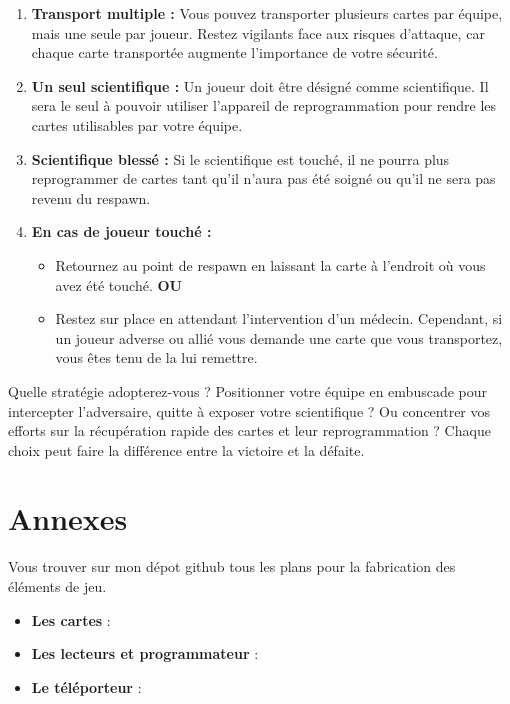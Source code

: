 \documentclass{template}
\begin{document}
\begin{enumerate}
    \item \textbf{Transport multiple :} Vous pouvez transporter plusieurs cartes par équipe, mais une seule par joueur. Restez vigilants face aux risques d’attaque, car chaque carte transportée augmente l’importance de votre sécurité.
    \item \textbf{Un seul scientifique :} Un joueur doit être désigné comme scientifique. Il sera le seul à pouvoir utiliser l’appareil de reprogrammation pour rendre les cartes utilisables par votre équipe.
    \item \textbf{Scientifique blessé :} Si le scientifique est touché, il ne pourra plus reprogrammer de cartes tant qu’il n’aura pas été soigné ou qu’il ne sera pas revenu du respawn.
    \item \textbf{En cas de joueur touché :}
    \begin{itemize}
        \item Retournez au point de respawn en laissant la carte à l’endroit où vous avez été touché.\newline
        \textbf{OU}
        \item Restez sur place en attendant l’intervention d’un médecin. Cependant, si un joueur adverse ou allié vous demande une carte que vous transportez, vous êtes tenu de la lui remettre.
    \end{itemize}
\end{enumerate}

Quelle stratégie adopterez-vous ? Positionner votre équipe en embuscade pour intercepter l’adversaire, quitte à exposer votre scientifique ? Ou concentrer vos efforts sur la récupération rapide des cartes et leur reprogrammation ? Chaque choix peut faire la différence entre la victoire et la défaite.






\section{Annexes}

Vous trouver sur mon dépot github tous les plans pour la fabrication des éléments de jeu.

\begin{itemize}
    \item \textbf{Les cartes} : 
    \item \textbf{Les lecteurs et programmateur} : 
    \item \textbf{Le téléporteur} : 
\end{itemize}
\end{document}
